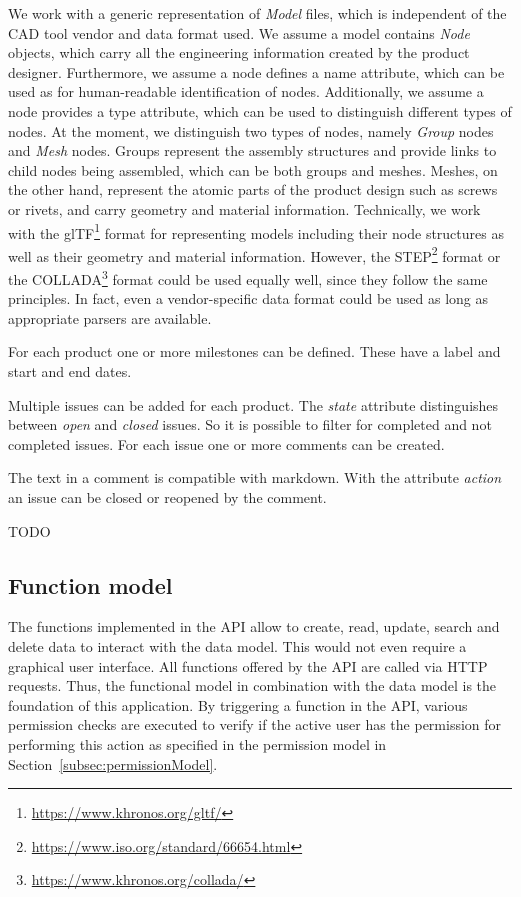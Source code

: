     We work with a generic representation of \textit{Model} files, which is independent of the CAD tool vendor and data format used.
    We assume a model contains \textit{Node} objects, which carry all the engineering information created by the product designer.
    Furthermore, we assume a node defines a name attribute, which can be used as for human-readable identification of nodes.
    Additionally, we assume a node provides a type attribute, which can be used to distinguish different types of nodes.
    At the moment, we distinguish two types of nodes, namely \textit{Group} nodes and \textit{Mesh} nodes.
    Groups represent the assembly structures and provide links to child nodes being assembled, which can be both groups and meshes.
    Meshes, on the other hand, represent the atomic parts of the product design such as screws or rivets, and carry geometry and material information.
    Technically, we work with the glTF\footnote{\url{https://www.khronos.org/gltf/}} format for representing models including their node structures as well as their geometry and material information.
    However, the STEP\footnote{\url{https://www.iso.org/standard/66654.html}} format or the COLLADA\footnote{\url{https://www.khronos.org/collada/}} format could be used equally well, since they follow the same principles.
    In fact, even a vendor-specific data format could be used as long as appropriate parsers are available.

    For each product one or more milestones can be defined.
    These have a label and start and end dates.

    Multiple issues can be added for each product.
    The \textit{state} attribute distinguishes between \textit{open} and \textit{closed} issues.
    So it is possible to filter for completed and not completed issues. For each issue one or more comments can be created.

    The text in a comment is compatible with markdown.
    With the attribute \textit{action} an issue can be closed or reopened by the comment.

    TODO

    \subsection*{Function model} 
    The functions implemented in the API allow to create, read, update, search and delete data to interact with the data model. This would not even require a graphical user interface. All functions offered by the API are called via HTTP requests. Thus, the functional model in combination with the data model is the foundation of this application. 
    By triggering a function in the API, various permission checks are executed to verify if the active user has the permission for performing this action as specified in the permission model in Section~\ref{subsec:permissionModel}. 


